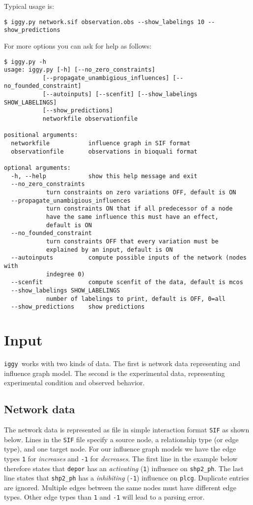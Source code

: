 \documentclass{article}
\newcommand\iggy{\texttt{iggy}}
\begin{document}
Typical usage is:
\begin{Verbatim}[frame=single]
$ iggy.py network.sif observation.obs --show_labelings 10 --show_predictions
\end{Verbatim}
For more options you can ask for help as follows:
\begin{Verbatim}[frame=single]
$ iggy.py -h        
usage: iggy.py [-h] [--no_zero_constraints]
           [--propagate_unambigious_influences] [--no_founded_constraint]
           [--autoinputs] [--scenfit] [--show_labelings SHOW_LABELINGS]
           [--show_predictions]
           networkfile observationfile

positional arguments:
  networkfile           influence graph in SIF format
  observationfile       observations in bioquali format

optional arguments:
  -h, --help            show this help message and exit
  --no_zero_constraints
            turn constraints on zero variations OFF, default is ON
  --propagate_unambigious_influences
            turn constraints ON that if all predecessor of a node
            have the same influence this must have an effect,
            default is ON
  --no_founded_constraint
            turn constraints OFF that every variation must be
            explained by an input, default is ON
  --autoinputs          compute possible inputs of the network (nodes with
            indegree 0)
  --scenfit             compute scenfit of the data, default is mcos
  --show_labelings SHOW_LABELINGS
            number of labelings to print, default is OFF, 0=all
  --show_predictions    show predictions
\end{Verbatim} 


\section{Input}

\iggy\ works with two kinds of data. 
The first is network data representing and influence graph model. 
The second is the experimental data, representing experimental condition and observed behavior.


\subsection{Network data}

The network data is represented as file in simple interaction format \texttt{SIF} as shown below.
Lines in the \texttt{SIF} file specify a source node, a relationship type (or edge type), and one target node.
For our influence graph models we have the edge types 
\texttt{1} for \emph{increases} 
and \texttt{-1} for \emph{decreases}.
The first line in the example below therefore states that
 \texttt{depor} has an \emph{activating} (\texttt{1}) influence on \texttt{shp2\_ph}.
The last line states that  \texttt{shp2\_ph} has a \emph{inhibiting} (\texttt{-1}) influence on \texttt{plcg}.
Duplicate entries are ignored. 
Multiple edges between the same nodes must have different edge types. 
Other edge types than \texttt{1} and \texttt{-1} will lead to a parsing error.
\end{document}
